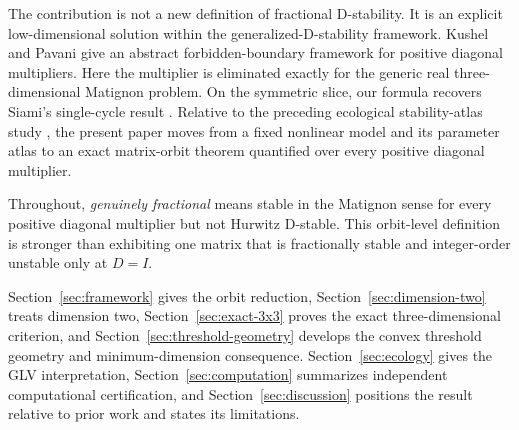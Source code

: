 The contribution is not a new definition of fractional D-stability. It is an explicit low-dimensional solution within the generalized-D-stability framework. Kushel and Pavani \cite{KushelPavani2022} give an abstract forbidden-boundary framework for positive diagonal multipliers. Here the multiplier is eliminated exactly for the generic real three-dimensional Matignon problem. On the symmetric slice, our formula recovers Siami's single-cycle result \cite{Siami2021}. Relative to the preceding ecological stability-atlas study \citep{AlraddadiAlharthi2026}, the present paper moves from a fixed nonlinear model and its parameter atlas to an exact matrix-orbit theorem quantified over every positive diagonal multiplier.

Throughout, \emph{genuinely fractional} means stable in the Matignon sense for every positive diagonal multiplier but not Hurwitz D-stable. This orbit-level definition is stronger than exhibiting one matrix that is fractionally stable and integer-order unstable only at \(D=I\).

Section~\ref{sec:framework} gives the orbit reduction, Section~\ref{sec:dimension-two} treats dimension two, Section~\ref{sec:exact-3x3} proves the exact three-dimensional criterion, and Section~\ref{sec:threshold-geometry} develops the convex threshold geometry and minimum-dimension consequence. Section~\ref{sec:ecology} gives the GLV interpretation, Section~\ref{sec:computation} summarizes independent computational certification, and Section~\ref{sec:discussion} positions the result relative to prior work and states its limitations.
